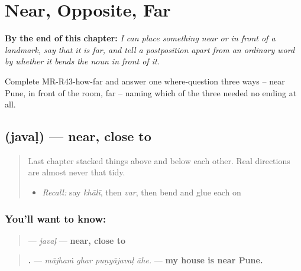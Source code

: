
\chapter{Near, Opposite, Far}
\label{ch:mr-near-opposite-far}

\begin{chapteropening}
\textbf{By the end of this chapter:} \emph{I can place something near or in front of a landmark, say that it is far, and tell a postposition apart from an ordinary word by whether it bends the noun in front of it.}

Complete MR-R43-how-far and answer one where-question three ways -- near Pune, in front of the room, far -- naming which of the three needed no ending at all.
\end{chapteropening}

\section[\texorpdfstring{\mr{जवळ} (javaḷ)}{जवळ (javaḷ)}]{ (javaḷ) — near, close to}

\label{lesson:MR-C43-javal}



\begin{quote}
Last chapter stacked things above and below each other. Real directions are almost never that tidy.

\begin{itemize}
\raggedright
  \item \emph{Recall:} say \emph{khālī}, then \emph{var}, then bend \textbf{} and glue each on
\end{itemize}
\end{quote}

\subsection*{You'll want to know: }
\begin{quote}
\textbf{} — \emph{javaḷ} — \textbf{near, close to}
\end{quote}

\begin{quote}
\textbf{   .} — \emph{mājhaṁ ghar puṇyājavaḷ āhe.} — \textbf{my house is near Pune.}
\end{quote}

